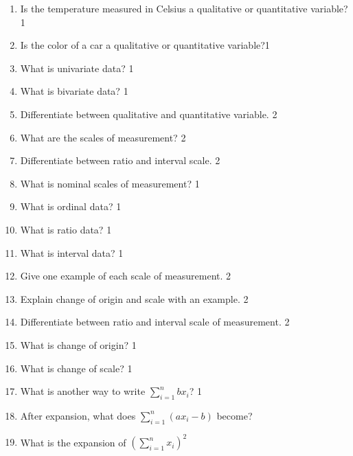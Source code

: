 \documentclass[a4paper,oneside]{book}
\begin{document}
\begin{enumerate}
\item Is the temperature measured in Celsius a qualitative or quantitative variable?\hfill 1

\item Is the color of a car a qualitative or quantitative variable?\hfill 1

\item What is univariate data? \hfill 1

\item What is bivariate data? \hfill 1

\item Differentiate between qualitative and quantitative variable. \hfill 2

\item What are the scales of measurement? \hfill 2

\item Differentiate between ratio and interval scale. \hfill 2

\item What is nominal scales of measurement? \hfill 1

\item What is ordinal data? \hfill 1

\item What is ratio data? \hfill 1

\item What is interval data? \hfill 1

\item Give one example of each scale of measurement. \hfill 2

\item Explain change of origin and scale with an example. \hfill 2

\item Differentiate between ratio and interval scale of measurement. \hfill 2

\item What is change of origin? \hfill 1

\item What is change of scale? \hfill 1

\item What is another way to write $\displaystyle \sum_{i=1}^n bx_i$?  \hfill 1

\item After expansion, what does 
$\displaystyle \sum_{i=1}^n \left( ax_i-b \right)$ become?

\item What is the expansion of $\displaystyle \left( \sum_{i=1}^n x_i\right)^2$


\end{enumerate}
\end{document}
